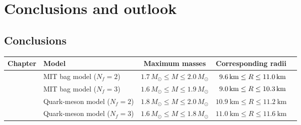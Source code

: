 \chapter{Conclusions and outlook}

\section{Conclusions}

\begin{table}
\centering
{\setlength{\tabcolsep}{4pt} %
\begin{tabular}{ l l c c c }
	\toprule
	Chapter & Model & Maximum masses & Corresponding radii                            \\
	\midrule
	\Cref{chap:mit} & MIT bag model ($N_f=2$) & $1.7 \, M_\odot \leq M \leq 2.0 \, M_\odot$ & $\hphantom{1}\SI{9.6}{\kilo\meter} \leq R \leq \SI{11.0}{\kilo\meter}$ \\
	\Cref{chap:mit} & MIT bag model ($N_f=3$) & $1.6 \, M_\odot \leq M \leq 1.9 \, M_\odot$ & $\hphantom{1}\SI{9.0}{\kilo\meter} \leq R \leq \SI{10.3}{\kilo\meter}$ \\
	\Cref{chap:lsm2f} & Quark-meson model ($N_f=2$) & $1.8 \, M_\odot \leq M \leq 2.0 \, M_\odot$ & $\SI{10.9}{\kilo\meter} \leq R \leq \SI{11.2}{\kilo\meter}$ \\
	\Cref{chap:lsm3f} & Quark-meson model ($N_f=3$) & $1.6 \, M_\odot \leq M \leq 1.8 \, M_\odot$ & $\SI{11.0}{\kilo\meter} \leq R \leq \SI{11.6}{\kilo\meter}$ \\

\end{tabular}}
\end{table}
